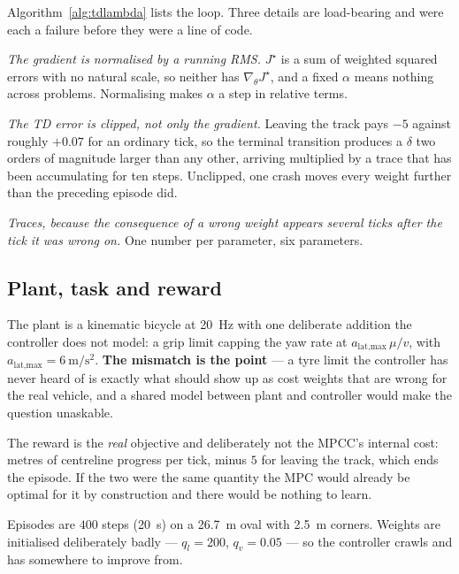 \documentclass[letterpaper, 10 pt, conference]{ieeeconf}
\begin{document}
Algorithm~\ref{alg:tdlambda} lists the loop. Three details are load-bearing and
were each a failure before they were a line of code.

\emph{The gradient is normalised by a running RMS.} $J^\star$ is a sum of
weighted squared errors with no natural scale, so neither has
$\nabla_\theta J^\star$, and a fixed $\alpha$ means nothing across problems.
Normalising makes $\alpha$ a step in relative terms.

\emph{The TD error is clipped, not only the gradient.} Leaving the track pays
$-5$ against roughly $+0.07$ for an ordinary tick, so the terminal transition
produces a $\delta$ two orders of magnitude larger than any other, arriving
multiplied by a trace that has been accumulating for ten steps. Unclipped, one
crash moves every weight further than the preceding episode did.

\emph{Traces, because the consequence of a wrong weight appears several ticks
after the tick it was wrong on.} One number per parameter, six parameters.

\subsection{Plant, task and reward}
The plant is a kinematic bicycle at \SI{20}{\hertz} with one deliberate
addition the controller does not model: a grip limit capping the yaw rate at
$a_{\text{lat,max}}\,\mu/v$, with $a_{\text{lat,max}} =
\SI{6}{\meter\per\second\squared}$. \textbf{The mismatch is the point} --- a
tyre limit the controller has never heard of is exactly what should show up as
cost weights that are wrong for the real vehicle, and a shared model between
plant and controller would make the question unaskable.

The reward is the \emph{real} objective and deliberately not the MPCC's internal
cost: metres of centreline progress per tick, minus $5$ for leaving the track,
which ends the episode. If the two were the same quantity the MPC would already
be optimal for it by construction and there would be nothing to learn.

Episodes are $400$ steps (\SI{20}{\second}) on a \SI{26.7}{\meter} oval with
\SI{2.5}{\meter} corners. Weights are initialised deliberately badly ---
$q_l = 200$, $q_v = 0.05$ --- so the controller crawls and has somewhere to
improve from.
\end{document}
